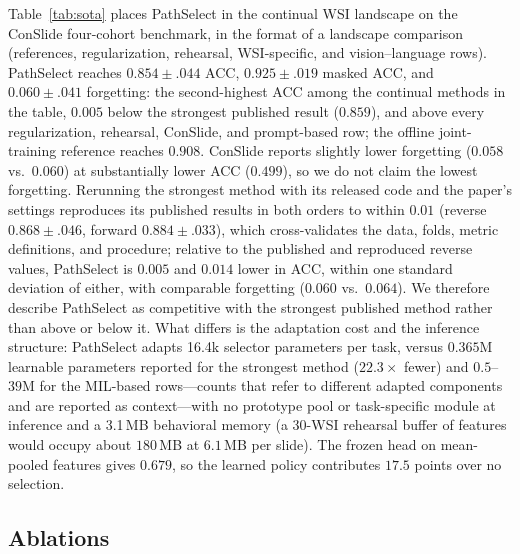 \documentclass{article}
\begin{document}
Table~\ref{tab:sota} places PathSelect in the continual WSI landscape on the ConSlide four-cohort benchmark, in the format of a landscape comparison (references, regularization, rehearsal, WSI-specific, and vision--language rows). PathSelect reaches $0.854{\pm}.044$ ACC, $0.925{\pm}.019$ masked ACC, and $0.060{\pm}.041$ forgetting: the second-highest ACC among the continual methods in the table, $0.005$ below the strongest published result ($0.859$), and above every regularization, rehearsal, ConSlide, and prompt-based row; the offline joint-training reference reaches $0.908$. ConSlide reports slightly lower forgetting ($0.058$ vs.\ $0.060$) at substantially lower ACC ($0.499$), so we do not claim the lowest forgetting. Rerunning the strongest method with its released code and the paper's settings reproduces its published results in both orders to within $0.01$ (reverse $0.868{\pm}.046$, forward $0.884{\pm}.033$), which cross-validates the data, folds, metric definitions, and procedure; relative to the published and reproduced reverse values, PathSelect is $0.005$ and $0.014$ lower in ACC, within one standard deviation of either, with comparable forgetting ($0.060$ vs.\ $0.064$). We therefore describe PathSelect as competitive with the strongest published method rather than above or below it. What differs is the adaptation cost and the inference structure: PathSelect adapts 16.4k selector parameters per task, versus $0.365$M learnable parameters reported for the strongest method ($22.3\times$ fewer) and $0.5$--$39$M for the MIL-based rows---counts that refer to different adapted components and are reported as context---with no prototype pool or task-specific module at inference and a 3.1\,MB behavioral memory (a 30-WSI rehearsal buffer of features would occupy about $180$\,MB at $6.1$\,MB per slide). The frozen head on mean-pooled features gives $0.679$, so the learned policy contributes $17.5$ points over no selection.

\subsection{Ablations}
\label{ssec:ablation}
\end{document}
